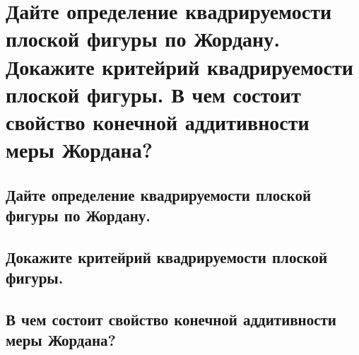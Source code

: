 \section{Дайте определение квадрируемости плоской фигуры по Жордану. Докажите критейрий квадрируемости плоской фигуры. В чем состоит свойство конечной аддитивности меры Жордана?}

\subsection{Дайте определение квадрируемости плоской фигуры по Жордану.}

\subsection{Докажите критейрий квадрируемости плоской фигуры.}

\subsection{В чем состоит свойство конечной аддитивности меры Жордана?}